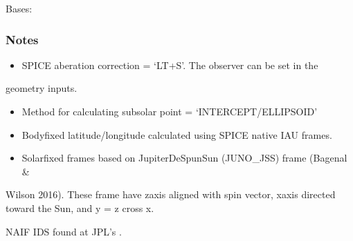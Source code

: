 \documentclass[letterpaper,10pt,english]{sphinxmanual}
\begin{document}
\begin{fulllineitems}
\label{\detokenize{nexoclom2/nexoclom2.solarsystem.SSPosition:nexoclom2.solarsystem.SSPosition.SSPosition}}
\pysigstartsignatures
\pysiglinewithargsret
{}
{\sphinxparamcomma {}\sphinxparamcomma {}\sphinxparamcomma {}}
{}
\pysigstopsignatures
\sphinxAtStartPar
Bases: 
\subsubsection*{Notes}
\begin{itemize}
\item {} 
\sphinxAtStartPar
SPICE aberation correction = ‘LT+S’. The observer can be set in the

\end{itemize}

\sphinxAtStartPar
geometry inputs.
\begin{itemize}
\item {} 
\sphinxAtStartPar
Method for calculating sub\sphinxhyphen{}solar point = ‘INTERCEPT/ELLIPSOID’

\item {} 
\sphinxAtStartPar
Body\sphinxhyphen{}fixed latitude/longitude calculated using SPICE native IAU frames.

\item {} 
\sphinxAtStartPar
Solar\sphinxhyphen{}fixed frames based on Jupiter\sphinxhyphen{}De\sphinxhyphen{}Spun\sphinxhyphen{}Sun (JUNO\_JSS) frame (Bagenal \&

\end{itemize}

\sphinxAtStartPar
Wilson 2016). These frame have z\sphinxhyphen{}axis aligned with spin vector, x\sphinxhyphen{}axis
directed toward the Sun, and y = z cross x.

\sphinxAtStartPar
NAIF IDS found at JPL’s .


\end{fulllineitems}
\end{document}
